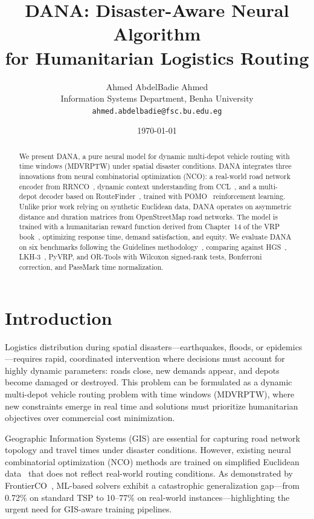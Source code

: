 \documentclass[12pt,a4paper]{article}
\title{DANA: Disaster-Aware Neural Algorithm\\for Humanitarian Logistics Routing}
\author{Ahmed AbdelBadie Ahmed\\
  Information Systems Department, Benha University\\
  \texttt{ahmed.abdelbadie@fsc.bu.edu.eg}
}
\date{\today}
\begin{document}
\maketitle

\begin{abstract}
	We present DANA, a pure neural model for dynamic multi-depot vehicle routing
	with time windows (MDVRPTW) under spatial disaster conditions. DANA integrates
	three innovations from neural combinatorial optimization (NCO): a real-world
	road network encoder from RRNCO~\cite{rrnco2026}, dynamic context understanding
	from CCL~\cite{ccl2026}, and a multi-depot decoder based on
	RouteFinder~\cite{routefinder2024}, trained with POMO~\cite{pomo2020}
	reinforcement learning. Unlike prior work relying on synthetic Euclidean data,
	DANA operates on asymmetric distance and duration matrices from OpenStreetMap
	road networks. The model is trained with a humanitarian reward function
	derived from Chapter~14 of the VRP book~\cite{vrpbook}, optimizing response
	time, demand satisfaction, and equity. We evaluate DANA on six benchmarks
	following the Guidelines methodology~\cite{guidelines2021}, comparing against
	HGS~\cite{hgs2021}, LKH-3~\cite{neuralkh2021}, PyVRP, and OR-Tools with
	Wilcoxon signed-rank tests, Bonferroni correction, and PassMark time
	normalization.
\end{abstract}

\section{Introduction}

Logistics distribution during spatial disasters---earthquakes, floods, or
epidemics---requires rapid, coordinated intervention where decisions must
account for highly dynamic parameters: roads close, new demands appear, and
depots become damaged or destroyed. This problem can be formulated as a dynamic
multi-depot vehicle routing problem with time windows (MDVRPTW), where new
constraints emerge in real time and solutions must prioritize humanitarian
objectives over commercial cost minimization.

Geographic Information Systems (GIS) are essential for capturing road network
topology and travel times under disaster conditions. However, existing neural
combinatorial optimization (NCO) methods are trained on simplified Euclidean
data~\cite{am2019,pomo2020} that does not reflect real-world routing
conditions. As demonstrated by FrontierCO~\cite{frontierco2026}, ML-based
solvers exhibit a catastrophic generalization gap---from 0.72\% on standard TSP
to 10--77\% on real-world instances---highlighting the urgent need for
GIS-aware training pipelines.
\end{document}
